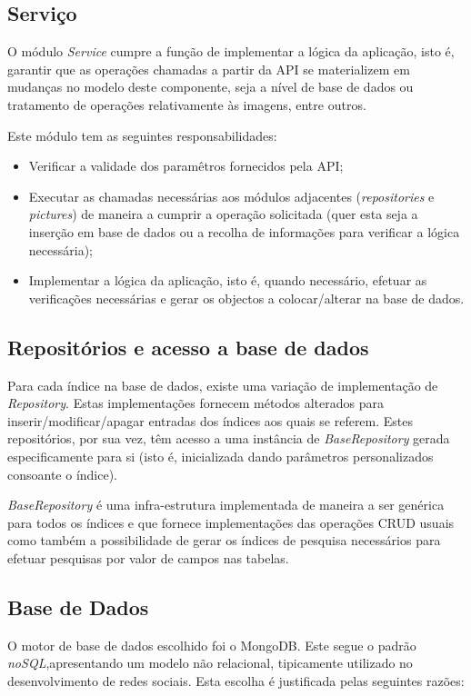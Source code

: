 \newpage

\subsection{Serviço}
O módulo \textit{Service} cumpre a função de implementar a lógica da aplicação, isto é, garantir que as operações chamadas a partir da API se materializem em mudanças no modelo deste componente, seja a nível de base de dados ou tratamento de operações relativamente às imagens, entre outros. \par \medskip

Este módulo tem as seguintes responsabilidades:
\begin{itemize}
	\item Verificar a validade dos paramêtros fornecidos pela API;
	\item Executar as chamadas necessárias aos módulos adjacentes (\textit{repositories} e \textit{pictures}) de maneira a cumprir a operação solicitada (quer esta seja a inserção em base de dados ou a recolha de informações para verificar a lógica necessária);
	\item Implementar a lógica da aplicação, isto é, quando necessário, efetuar as verificações necessárias e gerar os objectos a colocar/alterar na base de dados.
\end{itemize}

\subsection{Repositórios e acesso a base de dados}
Para cada índice na base de dados, existe uma variação de implementação de \textit{Repository}. Estas implementações fornecem métodos alterados para inserir/modificar/apagar entradas dos índices aos quais se referem. Estes repositórios, por sua vez, têm acesso a uma instância de \textit{BaseRepository} gerada especificamente para si (isto é, inicializada dando parâmetros personalizados consoante o índice). \par \medskip

\textit{BaseRepository} é uma infra-estrutura implementada de maneira a ser genérica para todos os índices e que fornece implementações das operações CRUD usuais como também a possibilidade de gerar os índices de pesquisa necessários para efetuar pesquisas por valor de campos nas tabelas. \par \medskip

\subsection{Base de Dados}
O motor de base de dados escolhido foi o MongoDB. Este segue o padrão \textit{noSQL},apresentando um modelo não relacional, tipicamente utilizado no desenvolvimento de redes sociais. Esta escolha é justificada pelas seguintes razões:

